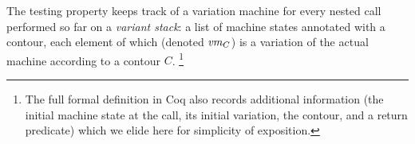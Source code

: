 \documentclass[acmsmall,review,anonymous]{acmart}\settopmatter{printfolios=true,printccs=false,printacmref=false}
\begin{document}
{ The testing property keeps track of a variation machine
for every nested call performed so far on a {\em variant stack}: a
list of machine states annotated with a contour, each element of which
(denoted $\mathit{vm}_{C}$) is a variation of the actual machine
according to a contour $C$.
%
\footnote{The full formal definition in Coq also records additional
  information (the initial machine state at the call, its initial
  variation, the contour, and a return predicate) which we elide
  here for simplicity of exposition.}


}
\end{document}
